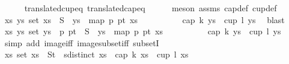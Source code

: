 \begin{isabellebody}
\ \ \ \ \isamarkupfalse%
\ translated{\isacharunderscore}{\kern0pt}cup{\isacharunderscore}{\kern0pt}eq\ translated{\isacharunderscore}{\kern0pt}cap{\isacharunderscore}{\kern0pt}eq\isanewline
\ \ \ \ \isamarkupfalse%
\ {\isacharparenleft}{\kern0pt}meson\ assms{\isacharparenleft}{\kern0pt}{}{\isacharparenright}{\kern0pt}\ cap{\isacharunderscore}{\kern0pt}def\ cup{\isacharunderscore}{\kern0pt}def{\isacharparenright}{\kern0pt}\isanewline
\ \ \isamarkupfalse%
\ {}{\isacharcolon}{\kern0pt}{\isachardoublequoteopen}{\isasymforall}xs{\isachardot}{\kern0pt}\ {\isasymforall}ys{\isachardot}{\kern0pt}\ set\ xs\ {\isasymsubseteq}\ S\ {\isasymand}\ {\isacharparenleft}{\kern0pt}ys\ {\isacharequal}{\kern0pt}\ map\ {\isacharparenleft}{\kern0pt}{\isasymlambda}p{\isachardot}{\kern0pt}\ p{\isacharplus}{\kern0pt}t{\isacharparenright}{\kern0pt}\ xs{\isacharparenright}{\kern0pt}\ \isanewline
\ \ \ \ \ \ \ \ {\isasymlongrightarrow}\ {\isasymnot}{\isacharparenleft}{\kern0pt}cap\ k\ ys\ {\isasymor}\ cup\ l\ ys{\isacharparenright}{\kern0pt}{\isachardoublequoteclose}\ \isamarkupfalse%
\ blast\isanewline
\ \ \isamarkupfalse%
\ {\isachardoublequoteopen}{\isasymforall}xs{\isachardot}{\kern0pt}\ {\isasymforall}ys{\isachardot}{\kern0pt}\ set\ ys\ {\isasymsubseteq}\ {\isacharparenleft}{\kern0pt}{\isacharparenleft}{\kern0pt}{\isasymlambda}p{\isachardot}{\kern0pt}\ p{\isacharplus}{\kern0pt}t{\isacharparenright}{\kern0pt}\ {\isacharbackquote}{\kern0pt}\ S{\isacharparenright}{\kern0pt}\ {\isasymand}\ {\isacharparenleft}{\kern0pt}ys\ {\isacharequal}{\kern0pt}\ map\ {\isacharparenleft}{\kern0pt}{\isasymlambda}p{\isachardot}{\kern0pt}\ p{\isacharplus}{\kern0pt}t{\isacharparenright}{\kern0pt}\ xs{\isacharparenright}{\kern0pt}\ \isanewline
\ \ \ \ \ \ \ \ {\isasymlongrightarrow}\ {\isasymnot}{\isacharparenleft}{\kern0pt}cap\ k\ ys\ {\isasymor}\ cup\ l\ ys{\isacharparenright}{\kern0pt}{\isachardoublequoteclose}\isanewline
\ \ \ \ \isamarkupfalse%
\ {\isacharparenleft}{\kern0pt}simp\ add{\isacharcolon}{\kern0pt}\ image{\isacharunderscore}{\kern0pt}iff\ image{\isacharunderscore}{\kern0pt}subset{\isacharunderscore}{\kern0pt}iff\ subsetI{\isacharparenright}{\kern0pt}\isanewline
\ \ \isamarkupfalse%
\ {\isachardoublequoteopen}{\isasymforall}xs{\isachardot}{\kern0pt}\ set\ xs\ {\isasymsubseteq}\ St\ {\isasymand}\ sdistinct\ xs\ {\isasymlongrightarrow}\ {\isasymnot}{\isacharparenleft}{\kern0pt}cap\ k\ xs\ {\isasymor}\ cup\ l\ xs{\isacharparenright}{\kern0pt}{\isachardoublequoteclose}\isanewline

\end{isabellebody}

